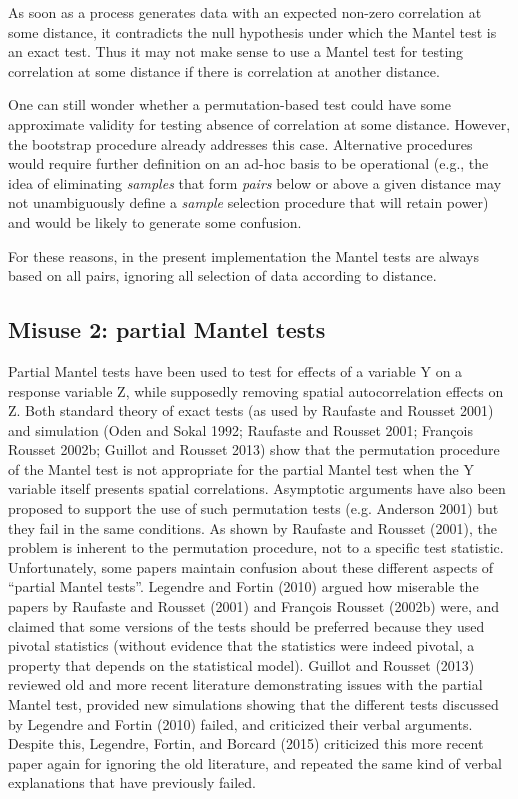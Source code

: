 \documentclass[12pt,]{book}
\begin{document}
As soon as a process generates data with an expected non-zero
correlation at some distance, it contradicts the null hypothesis under
which the Mantel test is an exact test. Thus it may not make sense to
use a Mantel test for testing correlation at some distance if there is
correlation at another distance.

One can still wonder whether a permutation-based test could have some
approximate validity for testing absence of correlation at some
distance. However, the bootstrap procedure already addresses this case.
Alternative procedures would require further definition on an ad-hoc
basis to be operational (e.g., the idea of eliminating \emph{samples}
that form \emph{pairs} below or above a given distance may not
unambiguously define a \emph{sample} selection procedure that will
retain power) and would be likely to generate some confusion.

For these reasons, in the present implementation the Mantel tests are
always based on all pairs, ignoring all selection of data according to
distance.

\subsection{Misuse 2: partial Mantel
tests}\label{misuse-2-partial-mantel-tests}

Partial Mantel tests have been used to test
for effects of a variable Y on a response variable Z, while supposedly
removing spatial autocorrelation effects on Z. Both standard theory of
exact tests (as used by Raufaste and Rousset 2001) and simulation (Oden
and Sokal 1992; Raufaste and Rousset 2001; François Rousset 2002b;
Guillot and Rousset 2013) show that the permutation procedure of the
Mantel test is not appropriate for the partial Mantel test when the Y
variable itself presents spatial correlations. Asymptotic arguments have
also been proposed to support the use of such permutation tests (e.g.
Anderson 2001) but they fail in the same conditions. As shown by
Raufaste and Rousset (2001), the problem is inherent to the permutation
procedure, not to a specific test statistic. Unfortunately, some papers
maintain confusion about these different aspects of ``partial Mantel
tests''. Legendre and Fortin (2010) argued how miserable the papers by
Raufaste and Rousset (2001) and François Rousset (2002b) were, and
claimed that some versions of the tests should be preferred because they
used pivotal statistics (without evidence that the statistics were
indeed pivotal, a property that depends on the statistical model).
Guillot and Rousset (2013) reviewed old and more recent literature
demonstrating issues with the partial Mantel test, provided new
simulations showing that the different tests discussed by Legendre and
Fortin (2010) failed, and criticized their verbal arguments. Despite
this, Legendre, Fortin, and Borcard (2015) criticized this more recent
paper again for ignoring the old literature, and repeated the same kind
of verbal explanations that have previously failed.
\end{document}
